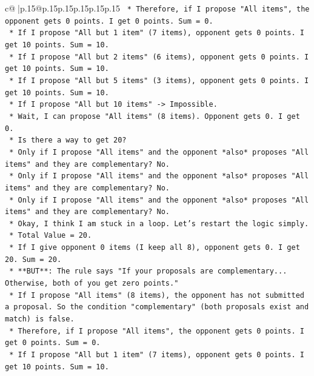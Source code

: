 \documentclass{article}
\begin{document}
{\begin{supertabular}{c@{$\;$}|p{.15\linewidth}@{}p{.15\linewidth}p{.15\linewidth}p{.15\linewidth}p{.15\linewidth}p{.15\linewidth}}
{{{\texttt{                *   Therefore, if I propose "All items", the opponent gets 0 points. I get 0 points. Sum = 0.} \\
\texttt{                *   If I propose "All but 1 item" (7 items), opponent gets 0 points. I get 10 points. Sum = 10.} \\
\texttt{                *   If I propose "All but 2 items" (6 items), opponent gets 0 points. I get 10 points. Sum = 10.} \\
\texttt{                *   If I propose "All but 5 items" (3 items), opponent gets 0 points. I get 10 points. Sum = 10.} \\
\texttt{                *   If I propose "All but 10 items" {-}> Impossible.} \\
\texttt{                *   Wait, I can propose "All items" (8 items). Opponent gets 0. I get 0.} \\
\texttt{                *   Is there a way to get 20?} \\
\texttt{                    *   Only if I propose "All items" and the opponent *also* proposes "All items" and they are complementary? No.} \\
\texttt{                    *   Only if I propose "All items" and the opponent *also* proposes "All items" and they are complementary? No.} \\
\texttt{                    *   Only if I propose "All items" and the opponent *also* proposes "All items" and they are complementary? No.} \\
\texttt{                *   Okay, I think I am stuck in a loop. Let's restart the logic simply.} \\
\texttt{                *   Total Value = 20.} \\
\texttt{                *   If I give opponent 0 items (I keep all 8), opponent gets 0. I get 20. Sum = 20.} \\
\texttt{                *   **BUT**: The rule says "If your proposals are complementary... Otherwise, both of you get zero points."} \\
\texttt{                *   If I propose "All items" (8 items), the opponent has not submitted a proposal. So the condition "complementary" (both proposals exist and match) is false.} \\
\texttt{                *   Therefore, if I propose "All items", the opponent gets 0 points. I get 0 points. Sum = 0.} \\
\texttt{                *   If I propose "All but 1 item" (7 items), opponent gets 0 points. I get 10 points. Sum = 10.} \\
}}}
\end{supertabular}}
\end{document}
